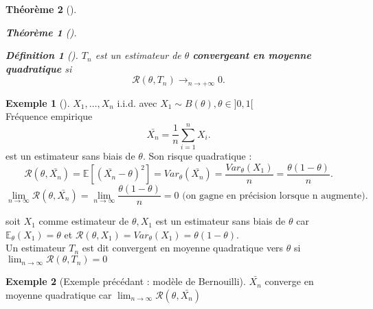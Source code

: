 \documentclass{article}
\theoremstyle{plain}%
\newtheorem{thm}{Théorème}[section]
\theoremstyle{definition}
\newtheorem{defn}{Définition}[section]
\newtheorem{exmp}{Exemple}[section]
\theoremstyle{remark}
\begin{document}
\begin{thm}[]
\begin{thm}[]
        \begin{defn}[]
            $ T_n $ est un estimateur de $ \theta  $ \textbf{convergeant en moyenne quadratique} si 
            \[
                \mathcal{R}(\theta , T_n) \longrightarrow _{n \to +\infty } 0
            .\]
        \end{defn}
    \end{thm}
\end{thm}


\begin{exmp}[]
    $ X_1, \dots, X_n  $ i.i.d. avec $ X_1 \sim B(\theta ) , \theta  \in ]0,1[$ \\
    Fréquence empirique 
    \[
        \bar{X_n} = \frac{1}{n}\sum_{i=1}^{n}X_i
    .\]
    est un estimateur sans biais de $ \theta  $. Son risque quadratique : 
    \[
        \mathcal{R}(\theta , \bar{X_n}) = \mathbb{E}[(\bar{X_n}-\theta )^2] = Var_\theta (\bar{X_n}) = \frac{Var_\theta (X_1)}{n}= \frac{\theta (1-\theta )}{n}
    .\]
    \[
        \lim_{n \to \infty} \mathcal{R}(\theta , \bar{X_n}) = \lim_{n \to \infty} \frac{\theta (1-\theta )}{n}= 0 \text{ (on gagne en précision lorsque n augmente)}
    .\]
    
    soit $ X_1 $ comme estimateur de $ \theta , X_1 $ est un estimateur sans biais de $ \theta  $ car $ \mathbb{E}_\theta (X_1) = \theta $ et $ \mathcal{R}(\theta , X_1) = Var_\theta (X_1) = \theta (1-\theta )$. \\ 
    Un estimateur $ T_n $ est dit convergent en moyenne quadratique vers $ \theta  $ si $ \lim_{n \to \infty} \mathcal{R}(\theta , T_n) = 0 $ 
\end{exmp}
\begin{exmp}[Exemple précédant : modèle de Bernouilli]
    $ \bar{X_n} $ converge en moyenne quadratique car $ \lim_{n \to \infty} \mathcal{R}(\theta , \bar{X_n}) $ 
\end{exmp}
\end{document}
